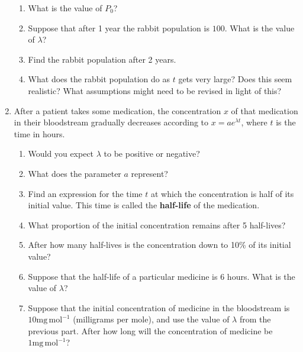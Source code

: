 \documentclass{article}
\begin{document}
\begin{enumerate}
\begin{enumerate}
			\item What is the value of $P_0$?
			\item Suppose that after 1 year the rabbit population is $100$. What is the value of $\lambda$?
			\item Find the rabbit population after 2 years.
			\item What does the rabbit population do as $t$ gets very large? Does this seem realistic? What assumptions might need to be revised in light of this?
		\end{enumerate}
	\item After a patient takes some medication, the concentration $x$ of that medication in their bloodstream gradually decreases according to $x=ae^{\lambda t}$, where $t$ is the time in hours.
		\begin{enumerate}
			\item Would you expect $\lambda$ to be positive or negative?
			\item What does the parameter $a$ represent?
			\item Find an expression for the time $t$ at which the concentration is half of its initial value. This time is called the \textbf{half-life} of the medication.
			\item What proportion of the initial concentration remains after 5 half-lives?
			\item After how many half-lives is the concentration down to 10\% of its initial value?
			\item Suppose that the half-life of a particular medicine is 6 hours. What is the value of $\lambda$?
			\item Suppose that the initial concentration of medicine in the bloodstream is $10\mathrm{mg\,mol}^{-1}$ (milligrams per mole), and use the value of $\lambda$ from the previous part. After how long will the concentration of medicine be $1\mathrm{mg\,mol}^{-1}$?
		\end{enumerate}
\end{enumerate}
\end{document}
